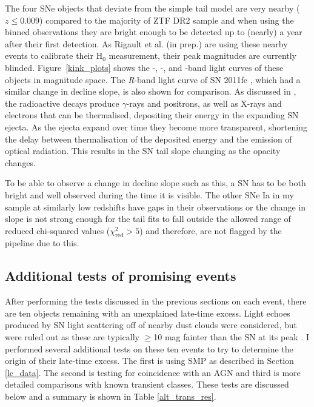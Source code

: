\documentclass[a4paper,oneside,12pt, class=Latex/Classes/PhDthesisPSnPDF, crop=false]{standalone}
\begin{document}
The four SNe objects that deviate from the simple tail model are very nearby ($z \leq 0.009$) compared to the majority of ZTF DR2 sample and when using the binned observations they are bright enough to be detected up to (nearly) a year after their first detection. As Rigault et al. (in prep.) are using these nearby events to calibrate their H$_0$ measurement, their peak magnitudes are currently blinded. Figure~\ref{kink_plots} shows the \ztfg-, \ztfr-, and \ztfi-band light curves of these objects in magnitude space. The \textit{R}-band light curve of SN 2011fe \citep{spec_Lijiang-2.4m}, which had a similar change in decline slope, is also shown for comparison. As discussed in \citet{Georgios_11fe}, the radioactive decays produce $\gamma$-rays and positrons, as well as X-rays and electrons that can be thermalised, depositing their energy in the expanding SN ejecta. As the ejecta expand over time they become more transparent, shortening the delay between thermalisation of the deposited energy and the emission of optical radiation. This results in the SN tail slope changing as the opacity changes.

To be able to observe a change in decline slope such as this, a SN has to be both bright and well observed during the time it is visible. The other SNe Ia in my sample at similarly low redshifts have gaps in their observations or the change in slope is not strong enough for the tail fits to fall outside the allowed range of reduced chi-squared values ($\chi^2_\text{red} > 5$) and therefore, are not flagged by the pipeline due to this.


\subsection{Additional tests of promising events}
\label{Additional_tests}
After performing the tests discussed in the previous sections on each event, there are ten objects remaining with an unexplained late-time excess. Light echoes produced by SN light scattering off of nearby dust clouds were considered, but were ruled out as these are typically $\geq$10 mag fainter than the SN at its peak \citep{Patat_light_echoes, 2012cg}. I performed several additional tests on these ten events to try to determine the origin of their late-time excess. The first is using SMP as described in Section \ref{lc_data}. The second is testing for coincidence with an AGN and third is more detailed comparisons with known transient classes. These tests are discussed below and a summary is shown in Table \ref{alt_trans_res}.
\end{document}
